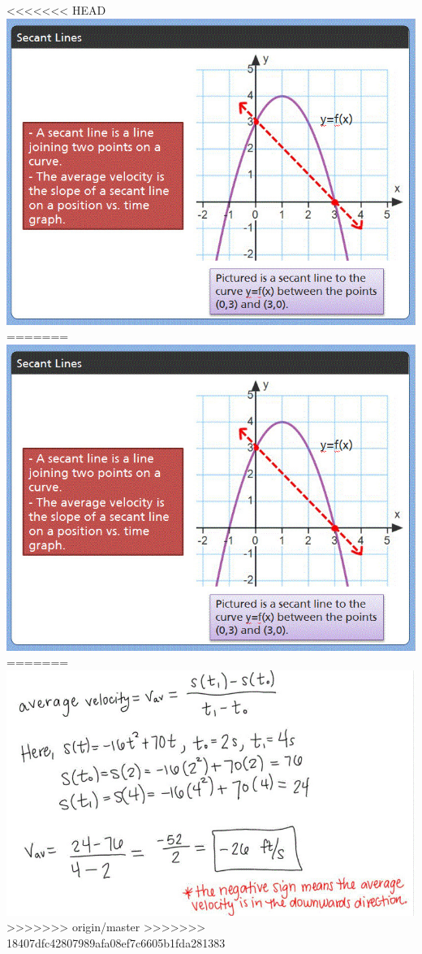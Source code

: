 \documentclass{ximera}
\begin{document}
\begin{image}
<<<<<<< HEAD
\includegraphics{picture5.jpg}
=======
\includegraphics{picture5.jpg}
=======
\includegraphics{picture2.jpg}
>>>>>>> origin/master
>>>>>>> 18407dfc42807989afa08ef7c6605b1fda281383
\end{image}
\end{document}
